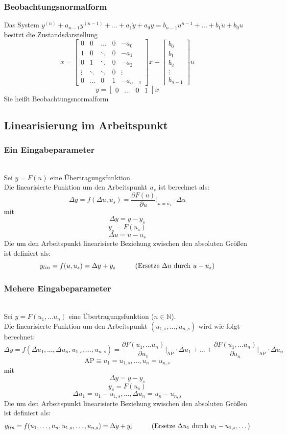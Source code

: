 \documentclass[10pt,a4paper]{article}
\newcommand{\tab}[1][1]{\hspace*{#1cm}}
\newcommand{\vect}[1]{\ensuremath{\begin{bmatrix}#1\end{bmatrix}}}
\begin{document}
\subsubsection{Beobachtungsnormalform}
Das System $y^{(n)} + a_{n-1} y^{(n-1)} + \dots + a_1 \dot y + a_0 y = b_{n-1} u^{n-1} + \dots + b_1 \dot u + b_0 u$ \\
besitzt die Zustandsdarstellung
$$
\dot x = \begin{bmatrix}
0 & 0 & \dots & 0 & -a_0 \\
1 & 0 & \ddots & 0 & -a_1 \\
0 & 1 & \ddots & 0 & -a_2\\
\vdots & \ddots & \ddots & 0 & \vdots \\
0 & \dots & 0 & 1 & -a_{n-1}
\end{bmatrix} x + \vect{b_0 \\ b_1 \\ b_2 \\ \vdots \\ b_{n-1}} u
$$
$$
y = \vect{0 & \dots & 0 & 1} x
$$
Sie heißt Beobachtungsnormalform

\subsection{Linearisierung im Arbeitspunkt}
\subsubsection{Ein Eingabeparameter} ~\\
Sei $y = F(u)$ eine Übertragungsfunktion. \\
Die linearisierte Funktion um den Arbeitspunkt $u_s$ ist berechnet als:
$$
	\Delta y = f(\Delta u, u_s) = \frac{\partial F(u)}{\partial u}\bigg|_{u = u_s} ⋅ \Delta u
$$
mit
$$
	\Delta y = y - y_s
$$
$$
	y_s = F(u_s)
$$
$$
	\Delta u = u - u_s
$$
Die um den Arbeitspunkt linearisierte Beziehung zwischen den absoluten Größen ist definiert als:
$$
	y_{lin} = f(u,u_s) = \Delta y + y_s \tab \text{(Ersetze $\Delta u$ durch $u - u_s$)}
$$

\subsubsection{Mehere Eingabeparameter} ~\\
Sei $y = F(u_1, \dots u_n)$ eine Übertragungsfunktion ($n \in \mathbb{N}$). \\
Die linearisierte Funktion um den Arbeitspunkt $(u_{1,s}, \dots, u_{n,s})$ wird wie folgt berechnet:
$$
\Delta y = f(\Delta u_1, \dots, \Delta u_n, u_{1,s}, \dots, u_{n,s}) = \frac{\partial F(u_1, \dots u_n)}{\partial u_1}\Bigg|_\textrm{AP} ⋅ \Delta u_1 + \dots + \frac{\partial F(u_1, \dots u_n)}{\partial u_n}\Bigg|_\textrm{AP} ⋅ \Delta u_n
$$
$$
	\textrm{AP} ≡ u_1 = u_{1,s}, \dots, u_n = u_{n,s}
$$
mit
$$
	\Delta y = y - y_s
$$
$$
	y_s = F(u_s)
$$
$$
	\Delta u_1 = u_1 - u_{1,s}, \dots, \Delta u_n = u_n - u_{n,s}
$$
Die um den Arbeitspunkt linearisierte Beziehung zwischen den absoluten Größen ist definiert als:
$$
y_{lin} = f(u_1, \dots, u_n, u_{1,s}, \dots, u_{n,s}) = \Delta y + y_s  \tab \text{(Ersetze $\Delta u_1$ durch $u_1 - u_{1,s}, \dots$)}
$$
\end{document}
